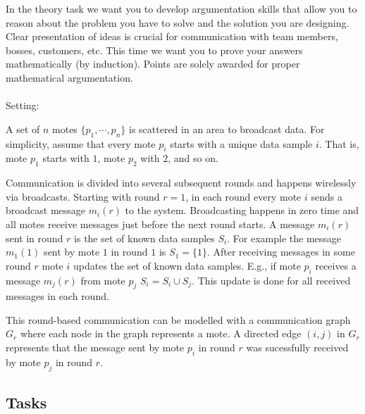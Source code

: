 In the theory task we want you to develop argumentation skills that
     allow you to reason about the problem you have to solve and the
     solution you are designing.
Clear presentation of ideas is crucial for communication with team
     members, bosses, customers, etc.
This time we want you to prove your answers mathematically (by
     induction).
Points are solely awarded for proper mathematical argumentation.\\
\\
Setting:

A set of $n$ motes $\{p_1,\cdots,p_n\}$ is scattered in an area to broadcast data.
For simplicity, assume that every mote $p_i$ starts with a unique data sample $i$.
That is, mote $p_1$ starts with $1$, mote $p_2$ with $2$, and so on.

Communication is divided into several subsequent rounds and happens wirelessly via broadcasts.
Starting with round $r=1$, in each round every mote $i$ sends a broadcast message $m_i(r)$ to the system.
Broadcasting happens in zero time and all motes receive messages just before the next round starts.
A message $m_i(r)$ sent in round $r$ is the set of known data samples $S_i$. 
For example the message $m_1(1)$ sent by mote $1$ in round $1$ is $S_1=\{1\}$.
After receiving messages in some round $r$ mote $i$ updates the set of known data samples. 
E.g., if mote $p_i$ receives a message $m_j(r)$ from mote $p_j$ $S_i=S_i\cup S_j$.
This update is done for all received messages in each round.

This round-based communication can be modelled with a communication graph $G_r$
where each node in the graph represents a mote. 
A directed edge $(i,j)$ in $G_r$ represents that the message sent by mote $p_i$ in round $r$ was sucessfully received by mote $p_j$ in round $r$. 

\subsection*{Tasks} 

